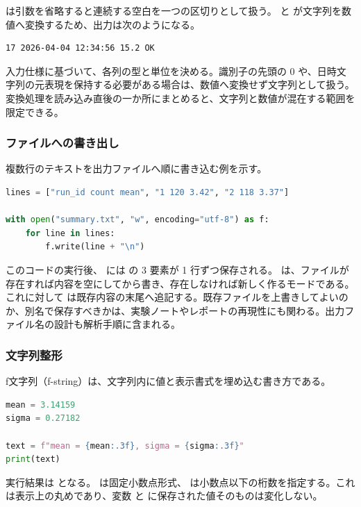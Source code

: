  は引数を省略すると連続する空白を一つの区切りとして扱う。 と  が文字列を数値へ変換するため、出力は次のようになる。

\begin{lstlisting}[numbers=none, xleftmargin=2\zw]
17 2026-04-04 12:34:56 15.2 OK
\end{lstlisting}

入力仕様に基づいて、各列の型と単位を決める。識別子の先頭の 0 や、日時文字列の元表現を保持する必要がある場合は、数値へ変換せず文字列として扱う。変換処理を読み込み直後の一か所にまとめると、文字列と数値が混在する範囲を限定できる。

\subsubsection{ファイルへの書き出し}

複数行のテキストを出力ファイルへ順に書き込む例を示す。

\begin{lstlisting}[language=Python]
lines = ["run_id count mean", "1 120 3.42", "2 118 3.37"]

with open("summary.txt", "w", encoding="utf-8") as f:
    for line in lines:
        f.write(line + "\n")
\end{lstlisting}

このコードの実行後、 には  の 3 要素が 1 行ずつ保存される。 は、ファイルが存在すれば内容を空にしてから書き、存在しなければ新しく作るモードである。これに対して  は既存内容の末尾へ追記する。既存ファイルを上書きしてよいのか、別名で保存すべきかは、実験ノートやレポートの再現性にも関わる。出力ファイル名の設計も解析手順に含まれる。

\subsubsection{文字列整形}

f文字列（f-string）は、文字列内に値と表示書式を埋め込む書き方である。

\begin{lstlisting}[language=Python]
mean = 3.14159
sigma = 0.27182

text = f"mean = {mean:.3f}, sigma = {sigma:.3f}"
print(text)
\end{lstlisting}

実行結果は  となる。 は固定小数点形式、 は小数点以下の桁数を指定する。これは表示上の丸めであり、変数  と  に保存された値そのものは変化しない。

